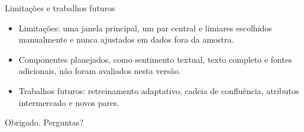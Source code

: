 \documentclass[aspectratio=169,17pt]{beamer}
\begin{document}
\begin{frame}{Limitações e trabalhos futuros}
  \begin{itemize}
    \item Limitações: uma janela principal, um par central e limiares escolhidos manualmente e nunca ajustados em dados fora da amostra.
    \item Componentes planejados, como sentimento textual, texto completo e fontes adicionais, não foram avaliados nesta versão.
    \item Trabalhos futuros: retreinamento adaptativo, cadeia de confluência, atributos intermercado e novos pares.
  \end{itemize}
\end{frame}

\begin{frame}
  \centering
  {\Large Obrigado. Perguntas?}
\end{frame}
\end{document}
